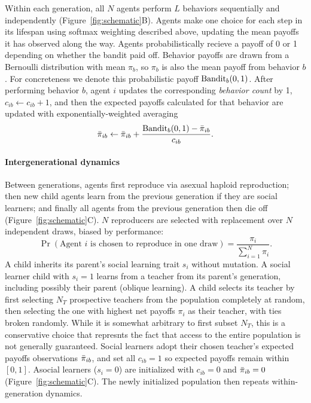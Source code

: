 \documentclass[letterpaper,11.5pt]{scrartcl}
\begin{document}
Within each generation, all $N$ agents perform $L$ behaviors sequentially and
independently (Figure~\ref{fig:schematic}B).
Agents make one choice for each step in its lifespan using softmax weighting
described above, updating the mean payoffs it has observed along the way. 
Agents probabilistically recieve a payoff of 0 or 1 depending on whether the
bandit paid off. Behavior payoffs are drawn from a 
Bernoulli distribution with mean $\pi_b$, so $\pi_b$ is also the mean payoff from
behavior $b$.  For concreteness we denote this probabilistic payoff
$\text{Bandit}_b(0, 1)$. After performing behavior $b$, agent $i$ updates the
corresponding \emph{behavior count} by 1, $c_{ib} \leftarrow c_{ib} + 1$, and then
the expected payoffs calculated for that behavior are updated with
exponentially-weighted averaging
\begin{equation}
  \bar\pi_{ib} \leftarrow \bar\pi_{ib} + \frac{\text{Bandit}_b(0, 1) - \bar\pi_{ib}}{c_{ib}}.
\end{equation}
\noindent


\paragraph{Intergenerational dynamics}
Between generations, agents first reproduce via asexual haploid reproduction; 
then new child agents learn from the
previous generation if they are social learners; and finally all agents from the
previous generation then die off (Figure~\ref{fig:schematic}C). 
$N$ reproducers are selected with replacement over $N$ independent draws, 
biased by performance:
\begin{equation}
  \Pr(\text{Agent $i$ is chosen to reproduce in one draw}) = \frac{\pi_i}{\sum_{i=1}^N \pi_i}.
\end{equation}
\noindent
A child inherits its parent's social learning trait $s_i$ without mutation.
A social learner child with $s_i = 1$ learns from a teacher from its parent's
generation, including possibly their parent (oblique learning). 
A child selects its teacher by first selecting $N_T$ prospective
teachers from the population completely at random, then selecting the one with
highest net payoffs $\pi_i$ as their teacher, with ties broken randomly. While it
is somewhat arbitrary to first subset $N_T$, this is a conservative choice that
represnts the fact that access to the entire population is not generally guaranteed.
Social learners adopt their chosen teacher's expected payoffs observations $\bar\pi_{ib}$,
and set all $c_{ib} = 1$ so expected payoffs remain within $[0, 1]$.  Asocial
learners ($s_i = 0$) are initialized with $c_{ib} = 0$ and $\bar\pi_{ib} = 0$ 
(Figure~\ref{fig:schematic}C). The
newly initialized population then repeats within-generation dynamics. 
\end{document}
